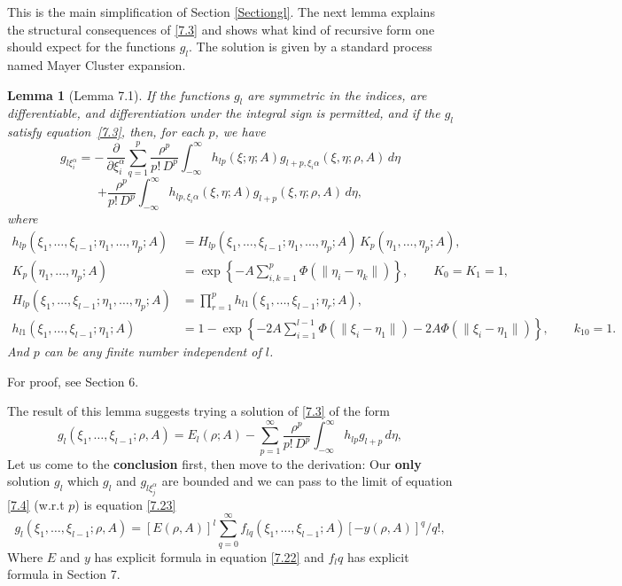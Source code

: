 \documentclass[11pt]{article}
\newtheorem{lemma}{Lemma}
\begin{document}
This is the main simplification of Section \ref{Sectiongl}. The next lemma explains the structural consequences of \eqref{7.3} and shows what kind of recursive form one should expect for the functions $g_l$. The solution is given by a standard process named Mayer Cluster expansion.\cite{MayerMayer1940}
\begin{lemma}[Lemma 7.1]\label{lemma7.1}
If the functions $g_l$ are symmetric in the indices, are differentiable, and
differentiation under the integral sign is permitted, and if the $g_l$ satisfy
equation~\eqref{7.3}, then, for each $p$, we have
\begin{equation*}
g_{l\xi_i^\alpha}
= -\,\frac{\partial}{\partial \xi_i^\alpha}
  \sum^p_{q=1}\frac{\rho^p}{p!\,D^p}
  \int_{-\infty}^{\infty}
  h_{l p}(\xi; \eta; A)
  g_{l+p,\xi_i\alpha}(\xi, \eta; \rho, A)
  \,d\eta
\end{equation*}\[
+\frac{\rho^p}{p!\,D^p}
  \int_{-\infty}^{\infty}
  h_{l p,\xi_i\alpha}(\xi, \eta; A)
  g_{l+p}(\xi, \eta; \rho, A)
  \,d\eta,
  \label{7.4}\tag{7.4}
\]
where
\begin{align*}
\label{7.5}\tag{7.5}
h_{l p}(\xi_1, \dots, \xi_{l-1}; \eta_1, \dots, \eta_p; A)
&= H_{lp}(\xi_1, \dots, \xi_{l-1}; \eta_1, \dots, \eta_p; A)\,
   K_p(\eta_1, \dots, \eta_p; A),
   \\[0.5em]
K_p(\eta_1, \dots, \eta_p; A)
&= \exp\!\left\{
  -A \sum_{i,k=1}^p \Phi(\|\eta_i - \eta_k\|)
  \right\},
  \qquad K_0 = K_1 = 1, \\[0.5em]
H_{l p}(\xi_1, \dots, \xi_{l-1}; \eta_1, \dots, \eta_p; A)
&= \prod_{r=1}^p h_{l1}(\xi_1, \dots, \xi_{l-1}; \eta_r; A), \\[0.5em]
h_{l1}(\xi_1, \dots, \xi_{l-1}; \eta_1; A)
&= 1 - \exp\!\left\{
  -2A \sum_{i=1}^{l-1} \Phi(\|\xi_i - \eta_1\|)-2A\Phi(\|\xi_i - \eta_1\|)
  \right\},
  \qquad k_{10} = 1.
\end{align*}And $p$ can be any finite number independent of $l$. 
\end{lemma} 

For proof, see \cite{Morrey1955}{Section 6}.



The result of this lemma suggests trying a solution of \eqref{7.3} of the form
\begin{equation}
\label{7.9}\tag{7.9}
g_l(\xi_1, \dots, \xi_{l-1}; \rho, A)
= E_l(\rho; A)
  - \sum_{p=1}^\infty \frac{\rho^p}{p!\,D^p}
  \int_{-\infty}^{\infty}
  h_{l p} g_{l+p}\,d\eta,
\end{equation}
Let us come to the \textbf{conclusion} first, then move to the derivation: Our \textbf{only} solution $g_l$ which $g_l$ and $g_{l\xi_j^\alpha}$ are bounded and we can pass to the limit of equation \eqref{7.4} (w.r.t $p$) is equation \eqref{7.23}
\[
g_l(\xi_1, \dots, \xi_{l-1}; \rho, A)
= [E(\rho, A)]^l
  \sum_{q=0}^{\infty}
  f_{l q}(\xi_1, \dots, \xi_{l-1}; A)
  [-y(\rho, A)]^q/q!,\]
Where $E$ and $y$ has explicit formula in equation \eqref{7.22} and $f_lq$ has explicit formula in Section 7.
\end{document}

